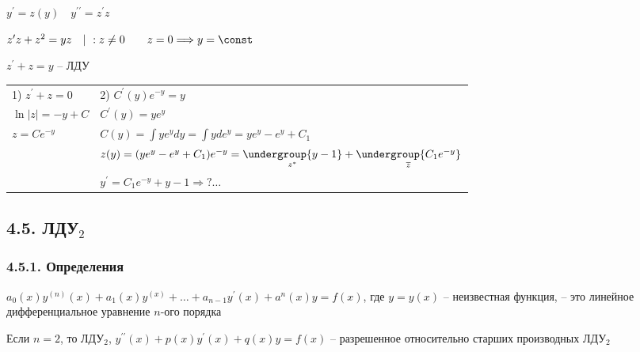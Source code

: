 \documentclass[12pt]{article}
\begin{document}
\begin{enumerate}[label*=\arabic** ]
        $y^\prime = z(y) \quad y^{\prime\prime} = z^\prime z$

        $z^\prime z + z^2 = yz \quad | \ : z \neq 0 \quad\quad z = 0 \Longrightarrow y = \const$

        $z^\prime + z = y$ -- ЛДУ

        \begin{tabular}{p{5cm}p{10cm}}
            1) $z^\prime + z = 0$ & 2) $C^\prime (y) e^{-y} = y$                                                                                              \\

            $\ln|z| = -y + C$     & $C^\prime (y) = ye^{y}$                                                                                                   \\

            $z = Ce^{-y}$         & $C(y) = \int y e^y dy = \int y de^y = ye^y - e^y + C_1$                                                                   \\

            & $z(y) = (ye^y - e^y + C_1)e^{-y} = \underset{z^*}{\undergroup{y - 1}} + \underset{\overline{z}}{\undergroup{C_1 e^{-y}}}$ \\

            & $y^\prime = C_1 e^{-y} + y - 1 \Longrightarrow ? \dots $

        \end{tabular}

    \end{enumerate}


    \subsection{4.5. ЛДУ$_2$}

    \hypertarget{lineardifferentialequationhigherdegree}{}

    \subsubsection{4.5.1. Определения}

    \Def $a_0(x) y^{(n)}(x) + a_1(x)y^{(x)} + \dots + a_{n - 1}y^\prime(x) + a^n(x)y = f(x)$, где $y = y(x)$ -- неизвестная функция, -- это линейное дифференциальное уравнение $n$-ого порядка

    \Notas Если $n = 2$, то ЛДУ$_2$, $y^{\prime\prime}(x) + p(x)y^\prime(x) + q(x)y = f(x)$ -- разрешенное относительно старших производных ЛДУ$_2$
\end{document}
